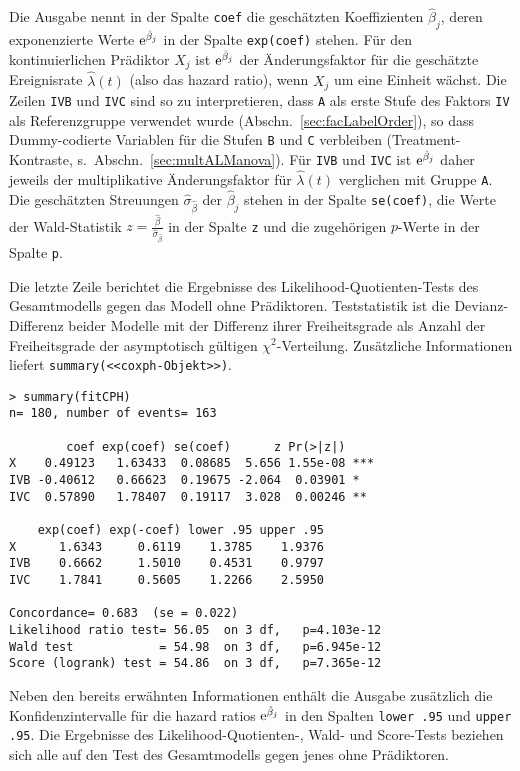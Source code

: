 Die Ausgabe nennt in der Spalte \lstinline!coef! die geschätzten Koeffizienten $\hat{\beta}_{j}$, deren exponenzierte Werte ${\mathrm{e}}^{\hat{\beta}_{j}}$ in der Spalte \lstinline!exp(coef)! stehen. Für den kontinuierlichen Prädiktor $X_{j}$ ist ${\mathrm{e}}^{\hat{\beta}_{j}}$ der Änderungsfaktor für die geschätzte Ereignisrate $\hat{\lambda}(t)$ (also das hazard ratio), wenn $X_{j}$ um eine Einheit wächst. Die Zeilen \lstinline!IVB! und \lstinline!IVC! sind so zu interpretieren, dass \lstinline!A! als erste Stufe des Faktors \lstinline!IV! als Referenzgruppe verwendet wurde (Abschn.\ \ref{sec:facLabelOrder}), so dass Dummy-codierte Variablen für die Stufen \lstinline!B! und \lstinline!C! verbleiben (Treatment-Kontraste, s.\ Abschn.\ \ref{sec:multALManova}). Für \lstinline!IVB! und \lstinline!IVC! ist ${\mathrm{e}}^{\hat{\beta}_{j}}$ daher jeweils der multiplikative Änderungsfaktor für $\hat{\lambda}(t)$ verglichen mit Gruppe \lstinline!A!. Die geschätzten Streuungen $\hat{\sigma}_{\hat{\beta}}$ der $\hat{\beta}_{j}$ stehen in der Spalte \lstinline!se(coef)!, die Werte der Wald-Statistik $z = \frac{\hat{\beta}}{\hat{\sigma}_{\hat{\beta}}}$ in der Spalte \lstinline!z! und die zugehörigen $p$-Werte in der Spalte \lstinline!p!.

Die letzte Zeile berichtet die Ergebnisse des Likelihood-Quotienten-Tests des Gesamtmodells gegen das Modell ohne Prädiktoren. Teststatistik ist die Devianz-Differenz beider Modelle mit der Differenz ihrer Freiheitsgrade als Anzahl der Freiheitsgrade der asymptotisch gültigen $\chi^{2}$-Verteilung. Zusätzliche Informationen liefert \lstinline!summary(<<coxph-Objekt>>)!.
\begin{lstlisting}
> summary(fitCPH)
n= 180, number of events= 163

        coef exp(coef) se(coef)      z Pr(>|z|)
X    0.49123   1.63433  0.08685  5.656 1.55e-08 ***
IVB -0.40612   0.66623  0.19675 -2.064  0.03901 *
IVC  0.57890   1.78407  0.19117  3.028  0.00246 **

    exp(coef) exp(-coef) lower .95 upper .95
X      1.6343     0.6119    1.3785    1.9376
IVB    0.6662     1.5010    0.4531    0.9797
IVC    1.7841     0.5605    1.2266    2.5950

Concordance= 0.683  (se = 0.022)
Likelihood ratio test= 56.05  on 3 df,   p=4.103e-12
Wald test            = 54.98  on 3 df,   p=6.945e-12
Score (logrank) test = 54.86  on 3 df,   p=7.365e-12
\end{lstlisting}

Neben den bereits erwähnten Informationen enthält die Ausgabe zusätzlich die Konfidenzintervalle für die hazard ratios ${\mathrm{e}}^{\hat{\beta}_{j}}$ in den Spalten \lstinline!lower .95! und \lstinline!upper .95!. Die Ergebnisse des Likelihood-Quotienten-, Wald- und Score-Tests beziehen sich alle auf den Test des Gesamtmodells gegen jenes ohne Prädiktoren.

